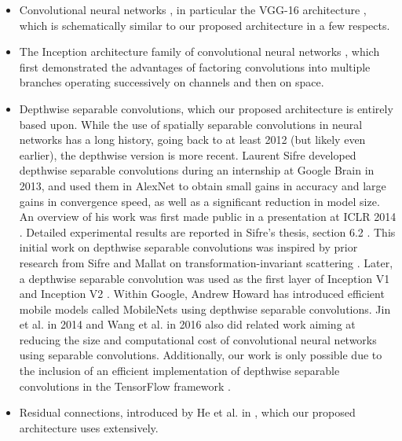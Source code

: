 \begin{itemize}
  \item Convolutional neural networks \cite{lecun1995learning, krizhevsky2012imagenet, zeiler2014visualizing}, in particular the VGG-16 architecture \cite{simonyan2014very}, which is schematically similar to our proposed architecture in a few respects.

  \item The Inception architecture family of convolutional neural networks \cite{szegedy2015going, ioffe2015batch, szegedy2015rethinking, inceptionResnet}, which first demonstrated the advantages of factoring convolutions into multiple branches operating successively on channels and then on space.

  \item Depthwise separable convolutions, which our proposed architecture is entirely based upon. While the use of spatially separable convolutions in neural networks has a long history, going back to at least 2012 \cite{mamalet12} (but likely even earlier), the depthwise version is more recent. Laurent Sifre developed depthwise separable convolutions during an internship at Google Brain in 2013, and used them in AlexNet to obtain small gains in accuracy and large gains in convergence speed, as well as a significant reduction in model size. An overview of his work was first made public in a presentation at ICLR 2014 \cite{vanhoucke-iclr14}. Detailed experimental results are reported in Sifre's thesis, section 6.2 \cite{sifre14}. This initial work on depthwise separable convolutions was inspired by prior research from Sifre and Mallat on transformation-invariant scattering \cite{sifre2013, sifre14}. Later, a depthwise separable convolution was used as the first layer of Inception V1 and Inception V2 \cite{szegedy2015going, ioffe2015batch}. Within Google, Andrew Howard \cite{Howard16} has introduced efficient mobile models called MobileNets using depthwise separable convolutions. Jin et al. in 2014 \cite{JinDC14} and Wang et al. in 2016 \cite{WangLF16b} also did related work aiming at reducing the size and computational cost of convolutional neural networks using separable convolutions. Additionally, our work is only possible due to the inclusion of an efficient implementation of depthwise separable convolutions in the TensorFlow framework \cite{tensorflow2015-whitepaper}.

  \item Residual connections, introduced by He et al. in \cite{he2015deep}, which our proposed architecture uses extensively.
\end{itemize}

